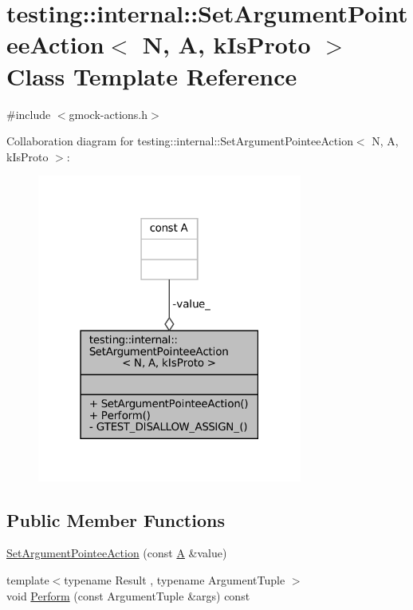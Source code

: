 \hypertarget{classtesting_1_1internal_1_1SetArgumentPointeeAction}{}\section{testing\+:\+:internal\+:\+:Set\+Argument\+Pointee\+Action$<$ N, A, k\+Is\+Proto $>$ Class Template Reference}
\label{classtesting_1_1internal_1_1SetArgumentPointeeAction}


{\ttfamily \#include $<$gmock-\/actions.\+h$>$}



Collaboration diagram for testing\+:\+:internal\+:\+:Set\+Argument\+Pointee\+Action$<$ N, A, k\+Is\+Proto $>$\+:
\nopagebreak
\begin{figure}[H]
\begin{center}
\leavevmode
\includegraphics[width=247pt]{classtesting_1_1internal_1_1SetArgumentPointeeAction__coll__graph}
\end{center}
\end{figure}
\subsection*{Public Member Functions}
\begin{DoxyCompactItemize}
\item 
\hyperlink{classtesting_1_1internal_1_1SetArgumentPointeeAction_a5a4119ed113667bd4a003ab0bec2cdff}{Set\+Argument\+Pointee\+Action} (const \hyperlink{namespacetesting_a5e9134d655d2fc9323902348083282e7}{A} \&value)
\item 
{\footnotesize template$<$typename Result , typename Argument\+Tuple $>$ }\\void \hyperlink{classtesting_1_1internal_1_1SetArgumentPointeeAction_a128320dcf991ff7f1a0087dab38b4014}{Perform} (const Argument\+Tuple \&args) const
\end{DoxyCompactItemize}
